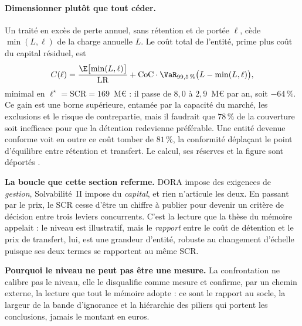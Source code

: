 \paragraph{Dimensionner plutôt que tout céder.} Un traité en excès de perte annuel, sans
rétention et de portée $\ell$, cède $\min(L,\ell)$ de la charge annuelle $L$. Le coût total de
l'entité, prime plus coût du capital résiduel, est
\begin{equation}%
C(\ell)=\frac{\E\bigl[\min(L,\ell)\bigr]}{\mathrm{LR}}
+\mathrm{CoC}\cdot\VaR_{99{,}5\,\%}\bigl(L-\min(L,\ell)\bigr),
\end{equation}
minimal en $\ell^\star=\mathrm{SCR}=169$~M\euro{} : il passe de $8{,}0$ à $2{,}9$~M\euro{} par
an, soit $-64\,\%$. Ce gain est une borne
supérieure, entamée par la capacité du marché, les exclusions et le risque de contrepartie, mais il
faudrait que $78\,\%$ de la couverture soit inefficace pour que la détention redevienne
préférable. Une entité devenue conforme voit en outre ce coût tomber de $81\,\%$, la conformité
déplaçant le point d'équilibre entre rétention et transfert. Le calcul, ses réserves et la figure
sont déportés \matcomp.

\begin{cle}
\textbf{La boucle que cette section referme.} DORA impose des exigences de \emph{gestion},
Solvabilité~II impose du \emph{capital}, et rien n'articule les deux. En passant par le prix,
le SCR cesse d'être un
chiffre à publier pour devenir un critère de décision entre trois leviers concurrents.
C'est la lecture que la thèse du mémoire appelait : le niveau est illustratif, mais le
\emph{rapport} entre le coût de détention et le prix de transfert, lui, est une grandeur
d'entité, robuste au changement d'échelle puisque ses deux termes se rapportent au même SCR.
\end{cle}

\begin{cle}
\textbf{Pourquoi le niveau ne peut pas être une mesure.} La confrontation ne calibre pas le
niveau, elle le
disqualifie comme mesure et confirme, par un chemin externe, la lecture que tout le
mémoire adopte : ce sont le rapport au socle, la largeur de la bande
d'ignorance et la hiérarchie des piliers qui portent les conclusions, jamais le
montant en euros.
\end{cle}


